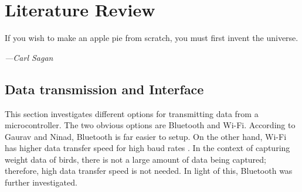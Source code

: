 \documentclass[class=report,11pt,crop=false]{standalone}
\begin{document}
\ifstandalone
\tableofcontents
\fi
\chapter{Literature Review \label{ch:literature}}
\epigraph{If you wish to make an apple pie from scratch, you must first invent the universe.}%
    {\emph{---Carl Sagan}}
\vspace{0.5cm}

\section{Data transmission and Interface}
This section investigates different options for transmitting data from a microcontroller. The two obvious options are Bluetooth and Wi-Fi. According to Gaurav and Ninad, Bluetooth is far easier to setup. On the other hand, Wi-Fi has higher data transfer speed for high baud rates  \cite{comparativewifi}. In the context of capturing weight data of birds, there is not a large amount of data being captured; therefore, high data transfer speed is not needed. In light of this, Bluetooth was further investigated.

\ifstandalone

\printnoidxglossary[type=\acronymtype,nonumberlist]
\fi
\end{document}
